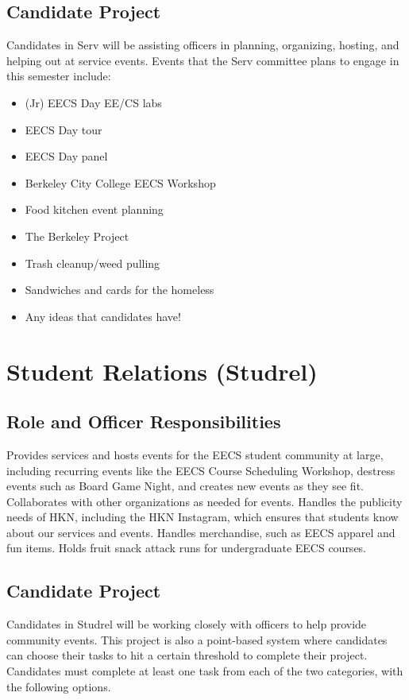 \documentclass[11pt, article, oneside]{memoir}
\begin{document}
    \subsection{Candidate Project}
        Candidates in Serv will be assisting officers in planning, organizing, hosting, and helping out at service events. Events that the Serv committee plans to engage in this semester include:
        \begin{itemize}
            \item (Jr) EECS Day EE/CS labs
            \item EECS Day tour
            \item EECS Day panel 
            \item Berkeley City College EECS Workshop 
            \item Food kitchen event planning 
            \item The Berkeley Project 
            \item Trash cleanup/weed pulling
            \item Sandwiches and cards for the homeless
            \item Any ideas that candidates have!
        \end{itemize}

    \bigbreak

    \section{Student Relations (Studrel)}
    \subsection{Role and Officer Responsibilities}
        Provides services and hosts events for the EECS student community at large, including recurring events like the EECS Course Scheduling Workshop, destress events such as Board Game Night, and creates new events as they see fit. Collaborates with other organizations as needed for events. Handles the publicity needs of HKN, including the HKN Instagram, which ensures that students know about our services and events. Handles merchandise, such as EECS apparel and fun items. Holds fruit snack attack runs for undergraduate EECS courses.

    \subsection{Candidate Project}
        Candidates in Studrel will be working closely with officers to help provide community events. This project is also a point-based system where candidates can choose their tasks to hit a certain threshold to complete their project. Candidates must complete at least one task from each of the two categories, with the following options.
\end{document}
